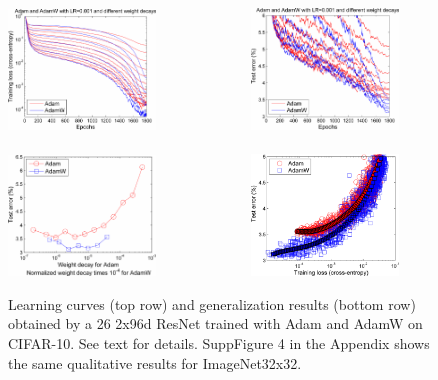 \documentclass[usenames,dvipsnames]{article} %
\begin{document}
\begin{figure}[t]%
\begin{center}
	\includegraphics[width=0.35\textwidth]{Adam_AdamWR0_2.pdf} $\;\;$~~~~~~~~~~~
  \includegraphics[width=0.35\textwidth]{Adam_AdamWR0_4.pdf}\\
	$\;\;$\\
	\includegraphics[width=0.35\textwidth]{Adam_AdamWR1_4.pdf} $\;\;$~~~~~~~~~~~
    \includegraphics[width=0.35\textwidth]{Adam_AdamWR2_4_fixed.pdf}
\vspace*{-0.2cm}\caption{\label{fig1800} Learning curves (top row) and generalization results (bottom row) obtained by a 26 2x96d ResNet trained with Adam and AdamW on CIFAR-10. 
See text for details. SuppFigure 4 in the Appendix shows the same qualitative results for ImageNet32x32.}\vspace*{-0.25cm}
\end{center}
\end{figure}
\end{document}
